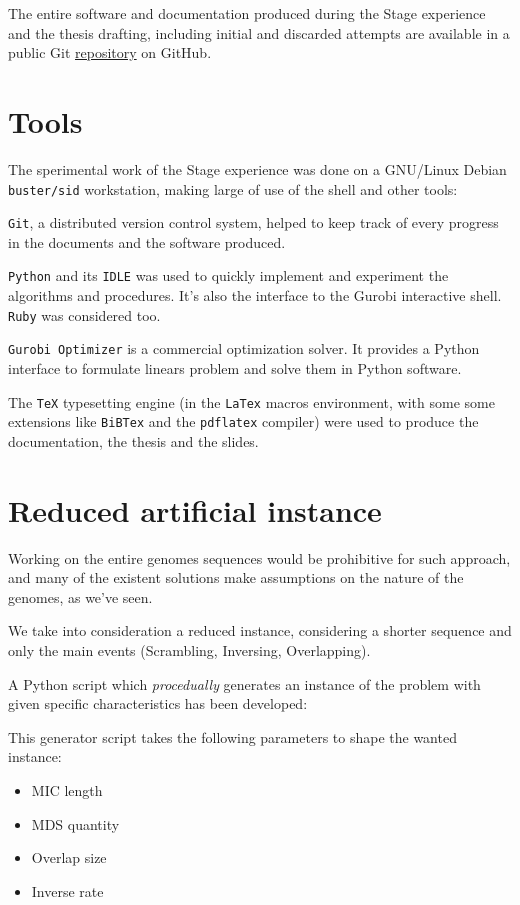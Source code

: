 The entire software and documentation produced during the Stage experience and the thesis drafting, including initial and discarded attempts are available in a public Git \href{https://github.com/avivace/dna-recombination}{repository} \cite{avivace_repo} on GitHub.

\section{Tools}
The sperimental work of the Stage experience was done on a GNU/Linux Debian \texttt{buster/sid} workstation, making large of use of the shell and other tools:

\texttt{Git}, a distributed version control system, helped to keep track of every progress in the documents and the software produced.

\texttt{Python} \cite{Rossum:1995:PRM:869369} and its \texttt{IDLE} was used to quickly implement and experiment the algorithms and procedures. It's also the interface to the Gurobi interactive shell. \texttt{Ruby} was considered too.

\texttt{Gurobi Optimizer} \cite{gurobi} is a commercial optimization solver. It provides a Python interface to formulate linears problem and solve them in Python software.

The \texttt{TeX} typesetting engine (in the \texttt{LaTex} macros environment, with some some extensions like \texttt{BiBTex} and the \texttt{pdflatex} compiler) were used to produce the documentation, the thesis and the slides.

\section{Reduced artificial instance}
Working on the entire genomes sequences would be prohibitive for such approach, and many of the existent solutions make assumptions on the nature of the genomes, as we've seen.

We take into consideration a reduced instance, considering a shorter sequence and only the main events (Scrambling, Inversing, Overlapping).

A Python script which \textit{procedually} generates an instance of the problem with given specific characteristics has been developed:

This generator script takes the following parameters to shape the wanted instance:

\begin{itemize}
	\item MIC length
	\item MDS quantity
	\item Overlap size
	\item Inverse rate
\end{itemize}


